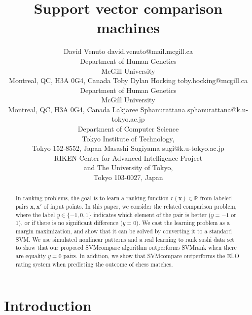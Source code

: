 \documentclass[twoside,11pt]{article}
\newcommand{\RR}{\mathbb R}
\begin{document}
	
	\title{Support vector comparison machines}
	
	\author{\name David Venuto \email david.venuto@mail.mcgill.ca \\
		\addr Department of Human Genetics\\
		McGill University \\
		Montreal, QC, H3A 0G4, Canada
		\AND
		\name Toby Dylan Hocking \email toby.hocking@mcgill.ca \\
		\addr Department of Human Genetics\\
		McGill University \\
		Montreal, QC, H3A 0G4, Canada
		\AND
		\name Lakjaree Sphanurattana \email sphanurattana@k.u-tokyo.ac.jp \\
		\addr Department of Computer Science\\
		Tokyo Institute of Technology,  \\
		Tokyo 152-8552, Japan
		\AND
		\name Masashi Sugiyama \email sugi@k.u-tokyo.ac.jp \\
		\addr RIKEN Center for Advanced Intelligence Project
		\\ and The University of Tokyo,  \\
		Tokyo 103-0027, Japan}
	
	
\maketitle


\begin{abstract}
  In ranking problems, the goal is to learn a ranking function
  $r(\mathbf x)\in\RR$ from labeled pairs $\mathbf x,\mathbf x'$ of
  input points. In this paper, we consider the related comparison
  problem, where the label $y\in\{-1,0,1\}$ indicates which element of
  the pair is better ($y = -1$ or $1$), or if there is no significant difference ($y=0$). We
  cast the learning problem as a margin maximization, and show that it
  can be solved by converting it to a standard SVM. We use simulated
  nonlinear patterns and a real learning to rank sushi data set to
  show that our proposed SVMcompare algorithm outperforms SVMrank when
  there are equality $y=0$ pairs.  In addition, we show that SVMcompare outperforms the ELO rating system when predicting the outcome of chess matches.
\end{abstract}


\newpage

\section{Introduction}
\end{document}
